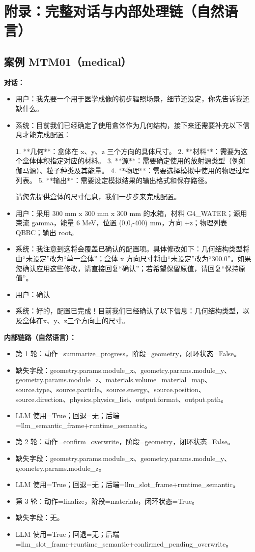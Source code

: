 \documentclass[11pt]{ctexart}
\begin{document}
\section{附录：完整对话与内部处理链（自然语言）}
\subsection{案例 MTM01（medical）}
\textbf{对话：}
\begin{itemize}
\item 用户：我先要一个用于医学成像的初步辐照场景，细节还没定，你先告诉我还缺什么。
\item 系统：目前我们已经确定了使用盒体作为几何结构，接下来还需要补充以下信息才能完成配置：

1.  **几何**：盒体在 x、y、z 三个方向的具体尺寸。
2.  **材料**：需要为这个盒体体积指定对应的材料。
3.  **源**：需要确定使用的放射源类型（例如伽马源）、粒子种类及其能量。
4.  **物理**：需要选择模拟中使用的物理过程列表。
5.  **输出**：需要设定模拟结果的输出格式和保存路径。

请您先提供盒体的尺寸信息，我们一步步来完成配置。
\item 用户：采用 300 mm x 300 mm x 300 mm 的水箱，材料 G4\_WATER；源用束流 gamma，能量 6 MeV，位置 (0,0,-400) mm，方向 +z；物理列表 QBBC；输出 root。
\item 系统：我注意到这将会覆盖已确认的配置项。具体修改如下：几何结构类型将由“未设定”改为“单一盒体”；盒体 x 方向尺寸将由“未设定”改为“300.0”。如果您确认应用这些修改，请直接回复“确认”；若希望保留原值，请回复“保持原值”。
\item 用户：确认
\item 系统：好的，配置已完成！目前我们已经确认了以下信息：几何结构类型，以及盒体在x、y、z三个方向上的尺寸。
\end{itemize}
\textbf{内部链路（自然语言）：}
\begin{itemize}
\item 第 1 轮：动作=summarize\_progress，阶段=geometry，闭环状态=False。
\item 缺失字段：geometry.params.module\_x、geometry.params.module\_y、geometry.params.module\_z、materials.volume\_material\_map、source.type、source.particle、source.energy、source.position、source.direction、physics.physics\_list、output.format、output.path。
\item LLM 使用=True；回退=无；后端=llm\_semantic\_frame+runtime\_semantic。
\item 第 2 轮：动作=confirm\_overwrite，阶段=geometry，闭环状态=False。
\item 缺失字段：geometry.params.module\_x、geometry.params.module\_y、geometry.params.module\_z。
\item LLM 使用=True；回退=无；后端=llm\_slot\_frame+runtime\_semantic。
\item 第 3 轮：动作=finalize，阶段=materials，闭环状态=True。
\item 缺失字段：无。
\item LLM 使用=True；回退=无；后端=llm\_slot\_frame+runtime\_semantic+confirmed\_pending\_overwrite。
\end{itemize}
\end{document}
